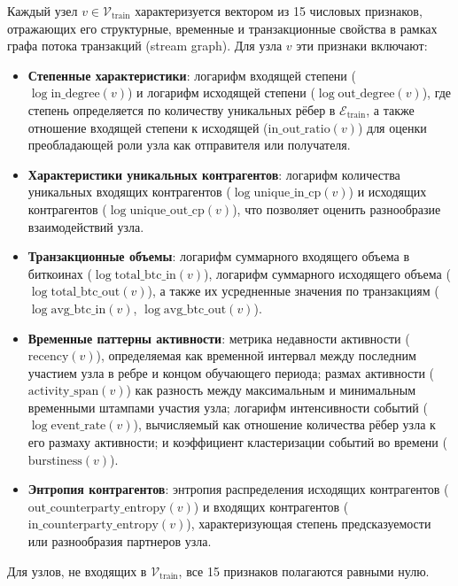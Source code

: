 \documentclass[a4paper,12pt]{extarticle}
\begin{document}
Каждый узел $v \in \mathcal{V}_{\text{train}}$ характеризуется вектором из 15 числовых признаков, отражающих его структурные, временные и транзакционные свойства в рамках графа потока транзакций (stream graph). Для узла $v$ эти признаки включают:
\begin{itemize}
    \item \textbf{Степенные характеристики}: логарифм входящей степени ($\log \text{in\_degree}(v)$) и логарифм исходящей степени ($\log \text{out\_degree}(v)$), где степень определяется по количеству уникальных рёбер в $\mathcal{E}_{\text{train}}$, а также отношение входящей степени к исходящей ($\text{in\_out\_ratio}(v)$) для оценки преобладающей роли узла как отправителя или получателя.
    \item \textbf{Характеристики уникальных контрагентов}: логарифм количества уникальных входящих контрагентов ($\log \text{unique\_in\_cp}(v)$) и исходящих контрагентов ($\log \text{unique\_out\_cp}(v)$), что позволяет оценить разнообразие взаимодействий узла.
    \item \textbf{Транзакционные объемы}: логарифм суммарного входящего объема в биткоинах ($\log \text{total\_btc\_in}(v)$), логарифм суммарного исходящего объема ($\log \text{total\_btc\_out}(v)$), а также их усредненные значения по транзакциям ($\log \text{avg\_btc\_in}(v)$, $\log \text{avg\_btc\_out}(v)$).
    \item \textbf{Временные паттерны активности}: метрика недавности активности ($\text{recency}(v)$), определяемая как временной интервал между последним участием узла в ребре и концом обучающего периода; размах активности ($\text{activity\_span}(v)$) как разность между максимальным и минимальным временными штампами участия узла; логарифм интенсивности событий ($\log \text{event\_rate}(v)$), вычисляемый как отношение количества рёбер узла к его размаху активности; и коэффициент кластеризации событий во времени ($\text{burstiness}(v)$).
    \item \textbf{Энтропия контрагентов}: энтропия распределения исходящих контрагентов ($\text{out\_counterparty\_entropy}(v)$) и входящих контрагентов ($\text{in\_counterparty\_entropy}(v)$), характеризующая степень предсказуемости или разнообразия партнеров узла.
\end{itemize}
Для узлов, не входящих в $\mathcal{V}_{\text{train}}$, все 15 признаков полагаются равными нулю.
\end{document}
